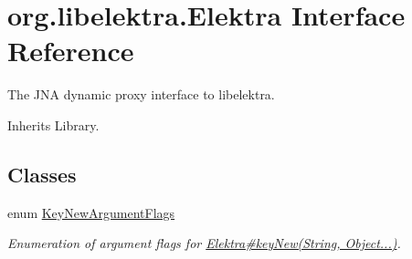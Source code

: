 \hypertarget{interfaceorg_1_1libelektra_1_1Elektra}{}\section{org.\+libelektra.\+Elektra Interface Reference}
\label{interfaceorg_1_1libelektra_1_1Elektra}


The J\+NA dynamic proxy interface to libelektra.  




Inherits Library.

\subsection*{Classes}
\begin{DoxyCompactItemize}
\item 
enum \hyperlink{enumorg_1_1libelektra_1_1Elektra_1_1KeyNewArgumentFlags}{Key\+New\+Argument\+Flags}
\begin{DoxyCompactList}\small\item\em Enumeration of argument flags for \hyperlink{}{Elektra\#key\+New(\+String, Object...)}. \end{DoxyCompactList}\end{DoxyCompactItemize}
